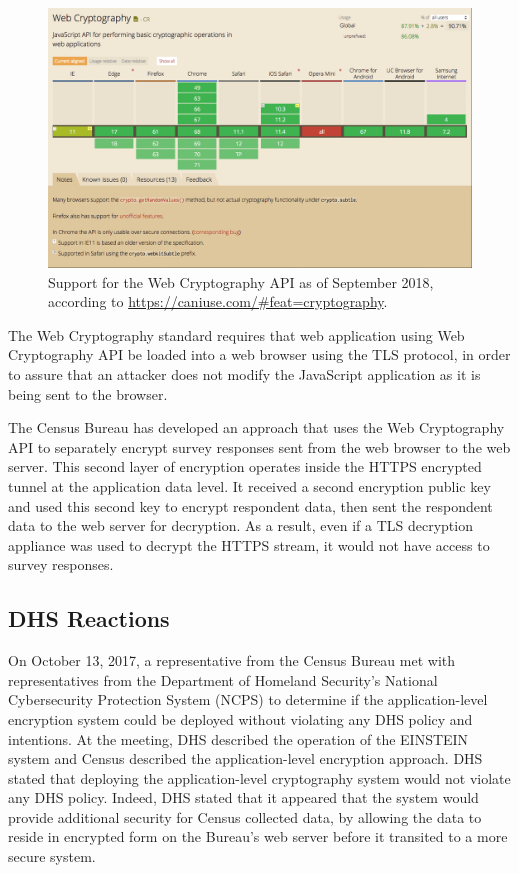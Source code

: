 \documentclass[fleqn,10pt]{wlscirep}
\begin{document}
\begin{figure}
  \includegraphics[width=\linewidth]{art/caniuse}
  \caption{Support for the Web Cryptography API as of September 2018,
    according to \url{https://caniuse.com/\#feat=cryptography}.\label{caniuse}}
\end{figure}

The Web Cryptography standard requires that web application using Web
Cryptography API be loaded into a web browser using the TLS protocol, in
order to assure that an attacker does not modify the JavaScript
application as it is being sent to the browser.

The Census Bureau has developed an approach that uses the Web
Cryptography API to separately encrypt survey responses sent from the
web browser to the web server. This second layer of encryption
operates inside the HTTPS encrypted tunnel at the application data
level. It received a second encryption public key and used this second
key to encrypt respondent data, then sent the respondent data to the
web server for decryption. As a result, even if a TLS decryption
appliance was used to decrypt the HTTPS stream, it would not have
access to survey responses.

\subsection{DHS Reactions}

On October 13, 2017, a representative from the Census Bureau met with representatives from the
Department of Homeland Security's National Cybersecurity Protection
System (NCPS) to determine if the application-level encryption system
could be deployed without violating any DHS policy and intentions. At
the meeting, DHS described the operation of the EINSTEIN system and
Census described the application-level encryption approach. DHS stated
that deploying the application-level cryptography system would not violate any
DHS policy. Indeed, DHS stated that it appeared that the system would
provide additional security for Census collected data, by allowing the
data to reside in encrypted form on the Bureau's web server before it
transited to a more secure system.
\end{document}
